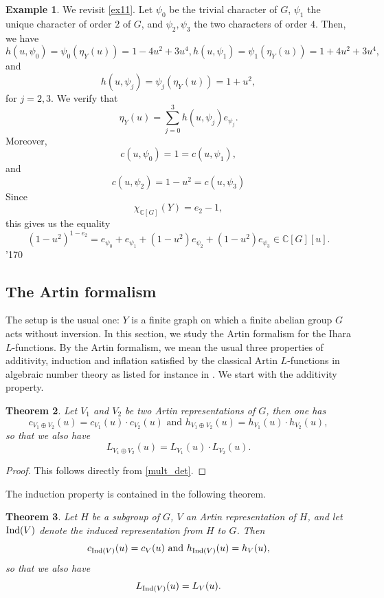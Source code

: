 \documentclass[11pt]{amsart}
\newtheorem{theorem}{Theorem}[section]
\numberwithin{equation}{section}
\theoremstyle{remark}
\theoremstyle{definition}
\newtheorem{example}[theorem]{Example}
\newcommand\xqed[1]{%
  \leavevmode\unskip\penalty9999 \hbox{}\nobreak\hfill
  \quad\hbox{#1}}
\newcommand\demo{\xqed{\manual\char'170}}
\begin{document}
\begin{example} \label{ex22}
We revisit \cref{ex11}.  Let $\psi_{0}$ be the trivial character of $G$, $\psi_{1}$ the unique character of order $2$ of $G$, and $\psi_{2}, \psi_{3}$ the two characters of order $4$.  Then, we have
$$h(u,\psi_{0}) = \psi_{0}(\eta_{Y}(u)) = 1-4u^{2} + 3u^{4}, h(u,\psi_{1}) = \psi_{1}(\eta_{Y}(u)) = 1 + 4u^{2} + 3u^{4},$$
and
$$h(u,\psi_{j}) = \psi_{j}(\eta_{Y}(u)) = 1+u^{2}, $$
for $j=2,3$.  We verify that
$$\eta_{Y}(u) = \sum_{j=0}^{3}h(u,\psi_{j})e_{\psi_{j}}. $$
Moreover,
$$c(u,\psi_{0}) = 1 = c(u,\psi_{1}), $$
and
$$c(u,\psi_{2}) = 1 - u^{2} = c(u,\psi_{3}) $$
Since 
$$\chi_{\mathbb{C}[G]}(Y) = e_{2} - 1, $$
this gives us the equality
$$(1-u^{2})^{1 - e_{2}} = e_{\psi_{0}} + e_{\psi_{1}} + (1-u^{2})e_{\psi_{2}} + (1-u^{2})e_{\psi_{3}} \in \mathbb{C}[G][u]. $$
\demo
\end{example}

\subsection{The Artin formalism} \label{af}
The setup is the usual one: $Y$ is a finite graph on which a finite abelian group $G$ acts without inversion.  In this section, we study the Artin formalism for the Ihara $L$-functions.  By the Artin formalism, we mean the usual three properties of additivity, induction and inflation satisfied by the classical Artin $L$-functions in algebraic number theory as listed for instance in \cite[page 15]{Tate:1984}.  We start with the additivity property.

\begin{theorem} \label{formalism_one}
Let $V_{1}$ and $V_{2}$ be two Artin representations of $G$, then one has
$$c_{V_{1} \oplus V_{2}}(u) = c_{V_{1}}(u) \cdot c_{V_{2}}(u) \text{ and } h_{V_{1} \oplus V_{2}}(u) = h_{V_{1}}(u) \cdot h_{V_{2}}(u), $$
so that we also have
$$L_{V_{1} \oplus V_{2}}(u) = L_{V_{1}}(u) \cdot L_{V_{2}}(u). $$
\end{theorem}
\begin{proof}
This follows directly from \cref{mult_det}.
\end{proof}


The induction property is contained in the following theorem.

\begin{theorem} \label{formalism_two}
Let $H$ be a subgroup of $G$, $V$ an Artin representation of $H$, and let ${\rm Ind}(V)$ denote the induced representation from $H$ to $G$.  Then
$$c_{{\rm Ind}(V)}(u) = c_{V}(u) \text{ and } h_{{\rm Ind}(V)}(u) = h_{V}(u), $$
so that we also have
$$L_{{\rm Ind}(V)}(u) = L_{V}(u). $$
\end{theorem}
\end{document}
